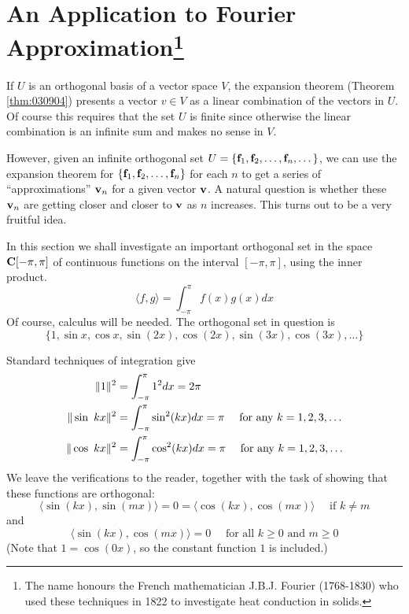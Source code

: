 \section[An Application to Fourier Approximation]{An Application to Fourier Approximation\footnote{The name honours the French mathematician J.B.J. Fourier (1768-1830) who used these techniques in 1822 to investigate heat conduction in solids.} }
\label{sec:10_5}

If $U$ is an orthogonal basis of a vector space $V$, the expansion theorem (Theorem \ref{thm:030904}) presents a vector $v \in V$ as a linear combination of the vectors in $U$. Of course this requires that the set $U$ is finite since otherwise the linear combination is an infinite sum and makes no sense in $V$. 

However, given an infinite orthogonal set $U = \{ \textbf{f}_1, \textbf{f}_2, \dots, \textbf{f}_n, \dots \}$, we can use the expansion theorem for $\{ \textbf{f}_1, \textbf{f}_2, \dots, \textbf{f}_n\}$ for each $n$ to get a series of ``approximations'' $\textbf{v}_n$ for a given vector $\textbf{v}$. A natural question is whether these $\textbf{v}_n$ are getting closer and closer to $\textbf{v}$ as $n$ increases. This turns out to be a very fruitful idea.  

In this section we shall investigate an important orthogonal set in the space $\textbf{C}[-\pi, \pi]$ of continuous functions on the interval $[-\pi, \pi]$, using the inner product.
\begin{equation*}
\langle f, g \rangle = \int_{-\pi}^{\pi} f(x)g(x)dx
\end{equation*}
Of course, calculus will be needed. The orthogonal set in question is
\begin{equation*}
\{1, \sin x, \cos x, \sin(2x), \cos(2x), \sin(3x), \cos(3x), \dots \}
\end{equation*}

Standard techniques of integration give
\begin{align*}
\| 1 \|^2 &= \int_{-\pi}^{\pi} 1^2 dx = 2\pi \\
\| \sin\ kx \| ^2 &= \int_{-\pi}^{\pi} \sin^2(kx) dx = \pi \quad \mbox{ for any } k = 1, 2, 3, \dots \\
\| \cos\ kx \| ^2 &= \int_{-\pi}^{\pi} \cos^2(kx) dx = \pi \quad \mbox{ for any } k = 1, 2, 3, \dots
\end{align*}
We leave the verifications to the reader, together with the task of showing that these functions are orthogonal:
\begin{equation*}
\langle \sin(kx), \sin(mx) \rangle = 0 = \langle \cos(kx), \cos(mx) \rangle \quad \mbox{ if } k \neq m
\end{equation*}
and
\begin{equation*}
\langle \sin(kx), \cos(mx) \rangle = 0 \quad \mbox{ for all } k \geq 0 \mbox{ and } m \geq 0
\end{equation*}
(Note that $1 = \cos(0x)$, so the constant function $1$ is included.)

